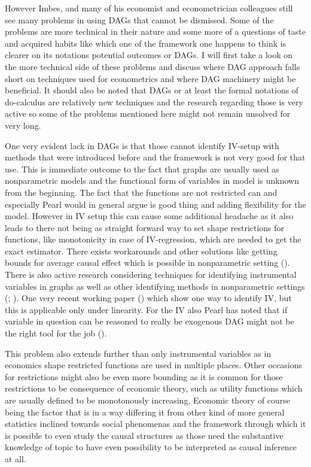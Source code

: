 \documentclass[main=english,12pt,a4paper,pdftex,econ,utf8]{aaltothesis}
\begin{document}
However Imbes, and many of his economist and econometrician colleagues still see many problems in using DAGs that cannot be dismissed. Some of the problems are more technical in their nature and some more of a questions of taste and acquired habits like which one of the framework one happens to think is clearer on its notations potential outcomes or DAGs. I will first take  a look on the more technical side of these problems and discuss where DAG approach falls short on techniques used for econometrics and where DAG machinery might be beneficial. It should also be noted that DAGs or at least the formal notations of do-calculus are relatively new techniques and the research regarding those is very active so some of the problems mentioned here might not remain unsolved for very long.

One very evident lack in DAGs is that those cannot identify IV-setup with methods that were introduced before and the framework is not very good for that use. This is immediate outcome to the fact that graphs are usually used as nonparametric models and the functional form of variables in model is unknown from the beginning. The fact that the functions are not restricted can and especially Pearl would in general argue is good thing and adding flexibility for the model. However in IV setup this can cause some additional headache as it also leads to there not being as straight forward way to set shape restrictions for functions, like monotonicity in case of IV-regression, which are needed to get the exact estimator. There exists workarounds and other solutions like getting bounds for average causal effect which is possible in nonparametric setting (\cite{Balke1997}). There is also active research considering techniques for identifying instrumental variables in graphs as well as other identifying methods in nonparametric settings (\cite{Freyberger2017}; \cite{Freyberger2015}). One very recent working paper (\cite{Hoveid2021}) which show one way to identify IV, but this is applicable only under linearity. For the IV also Pearl has noted that if variable in question can be reasoned to really be exogenous DAG might not be the right tool for the job (\cite{PearlMackenzie18}).

This problem also extends further than only instrumental variables as in economics shape restricted functions are used in multiple places. Other occasions for restrictions might also be even more bounding as it is common for those restrictions to be consequence of economic theory, such as utility functions which are usually defined to be monotonously increasing. Economic theory of course being the factor that is in a way differing it from other kind of more general statistics inclined towards social phenomenas and the framework through which it is possible to even study the causal structures as those need the substantive knowledge of topic to have even possibility to be interpreted as causal inference at all. 
\end{document}
